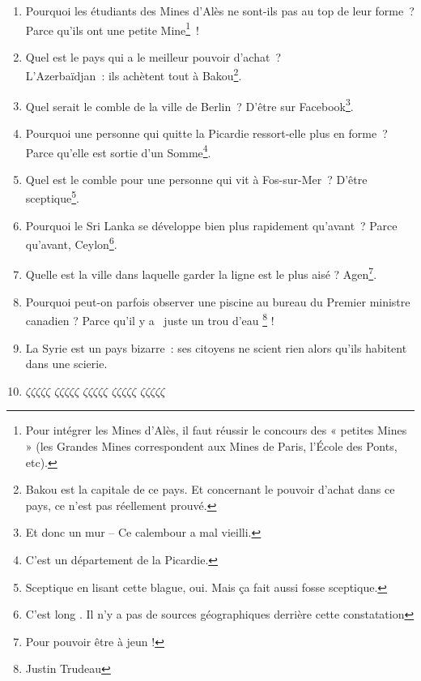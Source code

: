 \documentclass[10pt,a5paper,fullpage]{book}
\begin{document}
\begin{enumerate}
		\item Pourquoi les étudiants des Mines d’Alès ne sont-ils pas au top de leur forme~? Parce qu’ils ont une petite Mine\footnote{Pour intégrer les Mines d’Alès, il faut réussir le concours des « petites Mines » (les Grandes Mines correspondent aux Mines de Paris, l’École des Ponts, etc).}~!
		\item Quel est le pays qui a le meilleur pouvoir d’achat~? \\L’Azerbaïdjan~: ils achètent tout à Bakou\footnote{Bakou est la capitale de ce pays. Et concernant le pouvoir d'achat dans ce pays, ce n'est pas réellement prouvé.}.
		\item Quel serait le comble de la ville de Berlin~? D'être sur Facebook\footnote{ Et donc un mur -- Ce calembour a mal vieilli.}. 
		\item Pourquoi une personne qui quitte la Picardie ressort-elle plus en forme~? Parce qu'elle est sortie d'un Somme\footnote{C'est un département de la Picardie.}. 
		\item Quel est le comble pour une personne qui vit à Fos-sur-Mer~? D'être sceptique\footnote{Sceptique en lisant cette blague, oui. Mais ça fait aussi fosse sceptique.}.
		\item Pourquoi le Sri Lanka se développe bien plus rapidement qu'avant~? Parce qu'avant, Ceylon\footnote{\guillemotleft C'est long \guillemotright. Il n'y a pas de sources géographiques derrière cette constatation}. 
		\item Quelle est la ville dans laquelle garder la ligne est le plus aisé ? Agen\footnote{Pour pouvoir être à jeun !}.
		\item Pourquoi peut-on parfois observer une piscine au bureau du Premier ministre canadien ? Parce qu'il y a \guillemotleft~juste un trou d'eau \guillemotright \footnote{Justin Trudeau} !
		\item La Syrie est un pays bizarre~: ses citoyens ne scient rien alors qu'ils habitent dans une scierie. 
		\item $\zeta\zeta\zeta\zeta\zeta$ $\zeta\zeta\zeta\zeta\zeta$ $\zeta\zeta\zeta\zeta\zeta$ $\zeta\zeta\zeta\zeta\zeta$ $\zeta\zeta\zeta\zeta\zeta$ \\ 

\end{enumerate}
\end{document}
